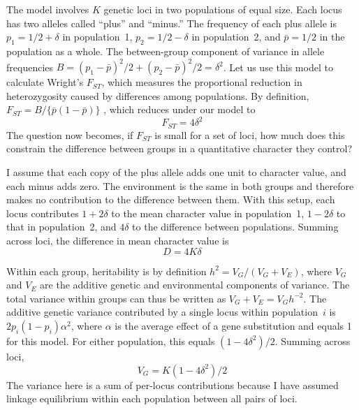 \documentclass[11pt]{article}
\begin{document}
The model involves $K$ genetic loci in two populations of equal
size. Each locus has two alleles called ``plus'' and ``minus.'' The
frequency of each plus allele is $p_1 = 1/2 + \delta$ in population~1,
$p_2 = 1/2 - \delta$ in population~2, and $\bar p = 1/2$ in the
population as a whole. The between-group component of variance in
allele frequencies $B = (p_1 - \bar p)^2/2 + (p_2 - \bar p)^2/2 =
\delta^2$. Let us use this model to calculate Wright's $F_{ST}$, which
measures the proportional reduction in heterozygosity caused by
differences among populations. By definition, $F_{ST} = B\big/\{\bar
p(1-\bar p)\}$ \citep{Wright:AE-15-323}, which reduces under our model
to
\begin{equation}
  F_{ST} = 4\delta^2
  \label{eq.Fst}
\end{equation}
The question now becomes, if $F_{ST}$ is small for a set of loci, how
much does this constrain the difference between groups in a
quantitative character they control?


I assume that each copy of the plus allele adds one unit to character
value, and each minus adds zero. The environment is the same in both
groups and therefore makes no contribution to the difference between
them.  With this setup, each locus contributes $1+2\delta$ to the mean
character value in population~1, $1-2\delta$ to that in population~2,
and $4\delta$ to the difference between populations. Summing across
loci, the difference in mean character value is
\[
D = 4K\delta
\]

Within each group, heritability is by definition $h^2 = V_G/(V_G +
V_E)$, where $V_G$ and $V_E$ are the additive genetic and
environmental components of variance. The total variance within groups
can thus be written as $V_G + V_E = V_G h^{-2}$.  The additive genetic
variance contributed by a single locus within population~$i$ is
$2p_i(1-p_i)\alpha^2$, where $\alpha$ is the average effect of a gene
substitution \citep{Fisher:AE-11-53} and equals 1 for this model. For
either population, this equals $(1 - 4\delta^2)/2$. Summing across
loci,
\[
V_G = K(1 - 4\delta^2)/2
\]
The variance here is a sum of per-locus contributions because I have
assumed linkage equilibrium within each population between all pairs
of loci.
\end{document}
